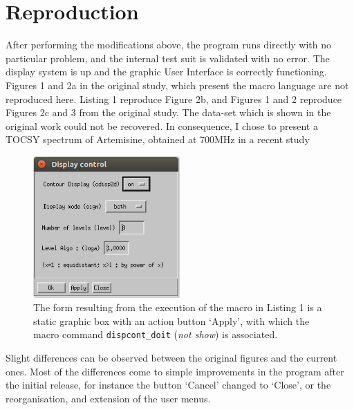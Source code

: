 \hypertarget{reproduction}{%
\section{Reproduction}\label{reproduction}}

After performing the modifications above, the program runs directly with
no particular problem, and the internal test suit is validated with no
error. The display system is up and the graphic User Interface is
correctly functioning. Figures 1 and 2a in the original study, which
present the macro language are not reproduced here. Listing 1 reproduce
Figure 2b, and Figures 1 and 2 reproduce Figures 2c and 3 from the
original study. The data-set which is shown in the original work could
not be recovered. In consequence, I chose to present a TOCSY spectrum of
Artemisine, obtained at 700MHz in a recent study \cite{Margueritte_2018}



\begin{figure}
\centering
\includegraphics[width=0.5\textwidth]{figure2c.png}
\caption{The form resulting from the execution of the macro in Listing 1
is a static graphic box with an action button `Apply', with which the
macro command \texttt{dispcont\_doit} (\emph{not show}) is associated.}
\end{figure}

Slight differences can be observed between the original figures and the
current ones. Most of the differences come to simple improvements in the
program after the initial release, for instance the button `Cancel'
changed to `Close', or the reorganisation, and extension of the user
menus.

